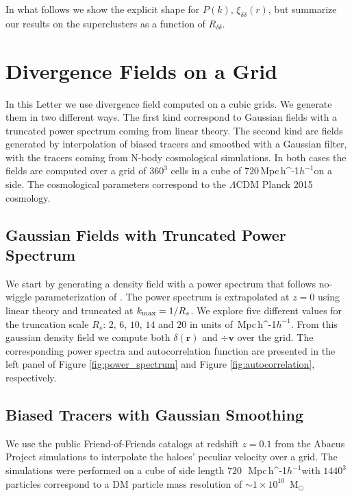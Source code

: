 \documentclass[usenatbib]{mnras}
\newcommand{\Msun}{\,{\rm M}$_{\odot}$\,}
\newcommand{\Mpch}{\,{\rm Mpc}\,\ifmmode h^{-1}\else $h^{-1}$\fi}
\begin{document}
In what follows we show the explicit shape for $P(k)$, $\xi_{\delta\delta}(r)$, but summarize our results on the superclusters as a function of $R_{\delta\delta}$. 




\label{sec:numerical_setup}
\section{Divergence Fields on a Grid}
In this Letter we use divergence field computed on a cubic grids. 
We generate them in two different ways.
The first kind correspond to Gaussian fields with a truncated power spectrum coming from linear theory.
The second kind are fields generated by interpolation of biased tracers and smoothed with a Gaussian filter, with the tracers coming from N-body cosmological simulations.
In both cases the fields are computed over a grid of $360^3$ cells in a cube of $720$\Mpch on a side. 
The cosmological parameters correspond to the
$\Lambda$CDM Planck 2015 cosmology. 

\subsection{Gaussian Fields with Truncated Power Spectrum}

We start by generating a density field with a power spectrum that follows no-wiggle parameterization of \cite{1998ApJ...496..605E}.
The power spectrum is extrapolated at $z=0$ using linear theory and truncated at $k_{\rm max}=1/R_s$.
We explore five different values for the truncation scale $R_s$: $2$, $6$, $10$, $14$ and $20$ in units of \Mpch.
From this gaussian density field we compute both $\delta(\textbf{r})$ and $\div \textbf{v}$ over the grid.
The corresponding power spectra and autocorrelation function are presented in the left panel of Figure \ref{fig:power_spectrum}
 and Figure \ref{fig:autocorrelation}, respectively.
 
\subsection{Biased Tracers with Gaussian Smoothing}

We use the public Friend-of-Friends catalogs at redshift $z=0.1$
from the Abacus Project simulations to interpolate the haloes' peculiar velocity over a grid.
The simulations were performed on a cube of side length $720$\ \Mpch with
$1440^3$ particles correspond to a DM particle mass resolution
of $\sim 1 \times 10^{10}$ \Msun
\end{document}
